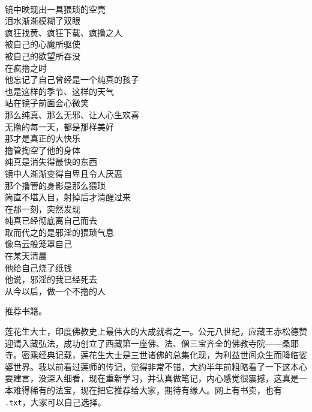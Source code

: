 \begin{poem}[消失的纯真]
    \begin{multicols}{2}
        \centering~\\
        镜中映现出一具猥琐的空壳 \\ 泪水渐渐模糊了双眼 \\ 疯狂找黄、疯狂下载、疯撸之人 \\ 被自己的心魔所驱使 \\ 被自己的欲望所吞没 \\ 在疯撸之时 \\ 他忘记了自己曾经是一个纯真的孩子 \\ 也是这样的季节、这样的天气 \\ 站在镜子前面会心微笑 \\ 那么纯真、那么无邪、让人心生欢喜 \\ 无撸的每一天，都是那样美好 \\ 那才是真正的大快乐 \\ 撸管掏空了他的身体 \\ 纯真是消失得最快的东西 \\ 镜中人渐渐变得自卑且令人厌恶 \\ 那个撸管的身影是那么猥琐 \\ 简直不堪入目，射掉后才清醒过来 \\ 在那一刻，突然发现 \\ 纯真已经彻底离自己而去 \\ 取而代之的是邪淫的猥琐气息 \\ 像乌云般笼罩自己 \\ 在某天清晨 \\ 他给自己烧了纸钱 \\ 他说，邪淫的我已经死去 \\ 从今以后，做一个不撸的人
    \end{multicols}
\end{poem}

推荐书籍。

\begin{book}
    莲花生大士，印度佛教史上最伟大的大成就者之一。公元八世纪，应藏王赤松德赞迎请入藏弘法，成功创立了西藏第一座佛、法、僧三宝齐全的佛教寺院——桑耶寺。密乘经典记载，莲花生大士是三世诸佛的总集化现，为利益世间众生而降临娑婆世界。我以前看过莲师的传记，觉得非常不错，大约半年前粗略看了一下这本心要建言，没深入细看，现在重新学习，并认真做笔记，内心感觉很震撼，这真是一本难得稀有的法宝，现在把它推荐给大家，期待有缘人。网上有书卖，也有 \texttt{.txt}，大家可以自己选择。
\end{book}

